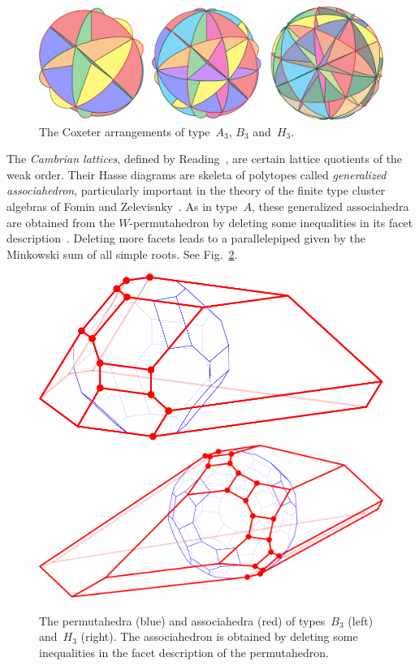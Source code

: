 \documentclass[a4paper,12pt]{article}
\newcommand{\defn}[1]{\emph{\color{blue} #1}} %
\begin{document}
\begin{figure}[h]
	\centerline{\includegraphics[width=\textwidth]{CoxeterArrangements}}
	\caption{The Coxeter arrangements of type~$A_3$, $B_3$ and~$H_3$.}
	\label{fig:CoxeterArrangements}
\end{figure}

The \defn{Cambrian lattices}, defined by Reading~\cite{Reading-cambrianLattices}, are certain lattice quotients of the weak order.
Their Hasse diagrams are skeleta of polytopes called \defn{generalized associahedron}, particularly important in the theory of the finite type cluster algebras of Fomin and Zelevisnky~\cite{FominZelevinsky-ClusterAlgebrasI, FominZelevinsky-ClusterAlgebrasII}.
As in type~$A$, these generalized associahedra are obtained from the $W$-permutahedron by deleting some inequalities in its facet description~\cite{HohlwegLangeThomas}.
Deleting more facets leads to a parallelepiped given by the Minkowski sum of all simple roots.
See Fig.~\ref{fig:generalizedAssociahedra}.

\begin{figure}[h]
	\centerline{\includegraphics[scale=.5]{associahedronTypeB}\quad\includegraphics[scale=.45]{associahedronTypeH}}
	\caption{The permutahedra (blue) and associahedra (red) of types~$B_3$ (left) and~$H_3$ (right). The associahedron is obtained by deleting some inequalities in the facet description of the permutahedron.}
	\label{fig:generalizedAssociahedra}
\end{figure}
\end{document}
